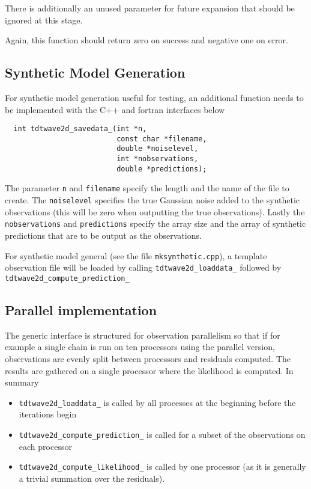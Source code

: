 \documentclass[a4paper,12pt]{article}
\begin{document}
There is additionally an unused parameter for future expansion that should be ignored
at this stage.

Again, this function should return zero on success and negative one on error.

\subsection{Synthetic Model Generation}

For synthetic model generation useful for testing, an additional function needs to be
implemented with the C++ and fortran interfaces below

\begin{verbatim}
  int tdtwave2d_savedata_(int *n,
                          const char *filename,
                          double *noiselevel,
                          int *nobservations,
                          double *predictions);
\end{verbatim}

The parameter {\tt n} and {\tt filename} specify the length and the name
of the file to create. The {\tt noiselevel} specifies the true Gaussian
noise added to the synthetic observations (this will be zero when
outputting the true observations). Lastly the {\tt nobservations} and
{\tt predictions} specify the array size and the array of synthetic
predictions that are to be output as the observations.

For synthetic model general (see the file {\tt mksynthetic.cpp}), a
template observation file will be loaded by calling {\tt tdtwave2d\_loaddata\_}
followed by {\tt tdtwave2d\_compute\_prediction\_} 

\subsection{Parallel implementation}

The generic interface is structured for observation parallelism so that if for example
a single chain is run on ten processors using the parallel version, observations are
evenly split between processors and residuals computed. The results are gathered on
a single processor where the likelihood is computed. In summary

\begin{itemize}
\item {\tt tdtwave2d\_loaddata\_} is called by all processes at the beginning before
  the iterations begin
\item {\tt tdtwave2d\_compute\_prediction\_} is called for a subset of the observations
  on each processor
\item {\tt tdtwave2d\_compute\_likelihood\_} is called by one processor (as it is
  generally a trivial summation over the residuals).
\end{itemize}
\end{document}

